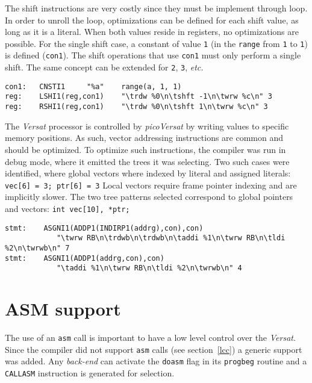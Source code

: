The shift instructions are very costly since they
must be implement through loop.
In order to unroll the loop, optimizations can be
defined for each shift value, as long as it is a literal.
When both values reside in registers, no optimizations
are possible.
For the single shift case, a constant of value {\tt 1} (in the
{\tt range} from {\tt 1} to {\tt 1}) is defined ({\tt con1}).
The shift operations that use {\tt con1} must only perform
a single shift.
The same concept can be extended for {\tt 2}, {\tt 3}, {\it etc.}
\begin{Verbatim}[baselinestretch=1.2]
con1:   CNSTI1     "%a"    range(a, 1, 1)
reg:    LSHI1(reg,con1)    "\trdw %0\n\tshft -1\n\twrw %c\n" 3
reg:    RSHI1(reg,con1)    "\trdw %0\n\tshft 1\n\twrw %c\n" 3
\end{Verbatim}

The {\it Versat} processor is controlled by {\it picoVersat} by
writing values to specific memory positions.
As such, vector addressing instructions are common and should
be optimized.
To optimize such instructions, the compiler was run in debug
mode, where it emitted the trees it was selecting.
Two such cases were identified, where global vectors where
indexed by literal and assigned literals:
{\tt vec[6] = 3; ptr[6] = 3}
Local vectors require frame pointer indexing and are implicitly
slower.
The two tree patterns selected correspond to global pointers
and vectors: {\tt int vec[10], *ptr;}
\begin{Verbatim}[baselinestretch=1.2]
stmt:    ASGNI1(ADDP1(INDIRP1(addrg),con),con)
            "\twrw RB\n\trdwb\n\trdwb\n\taddi %1\n\twrw RB\n\tldi %2\n\twrwb\n" 7
stmt:    ASGNI1(ADDP1(addrg,con),con)
            "\taddi %1\n\twrw RB\n\tldi %2\n\twrwb\n" 4
\end{Verbatim}


\section{{ASM} support}

The use of an {\tt asm} call is important to
have a low level control over the {\it Versat}.
Since the compiler did not support {\tt asm} calls
(see section~\ref{lcc}) a generic support was
added.
Any {\it back-end} can activate the {\tt doasm} flag
in its {\tt progbeg} routine and a {\tt CALLASM}
instruction is generated for selection.

